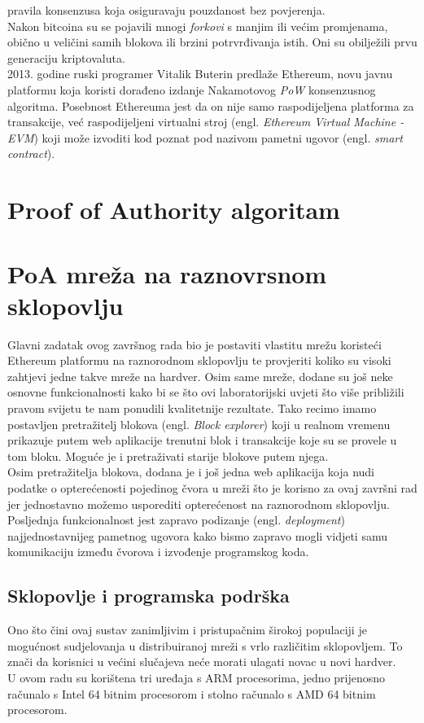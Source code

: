 \documentclass[times, utf8, zavrsni]{fer}
\begin{document}
pravila konsenzusa koja osiguravaju pouzdanost bez povjerenja. \\
Nakon bitcoina su se pojavili mnogi \emph{forkovi} s manjim ili većim promjenama, obično u veličini
samih blokova ili brzini potrvrđivanja istih. Oni su obilježili prvu generaciju kriptovaluta. \\
2013. godine ruski programer Vitalik Buterin predlaže Ethereum, novu javnu platformu koja koristi 
dorađeno izdanje Nakamotovog \emph{PoW} konsenzusnog algoritma. Posebnost Ethereuma jest da on nije
samo raspodijeljena platforma za transakcije, već raspodijeljeni virtualni stroj (engl. \emph{Ethereum Virtual Machine -EVM})
 koji može izvoditi kod poznat pod nazivom pametni ugovor (engl. \emph{smart contract}). \\



\chapter{Proof of Authority algoritam}

\chapter{PoA mreža na raznovrsnom sklopovlju}
Glavni zadatak ovog završnog rada bio je postaviti vlastitu mrežu koristeći Ethereum platformu na raznorodnom sklopovlju
te provjeriti koliko su visoki zahtjevi jedne takve mreže na hardver. Osim same mreže, dodane su još neke osnovne funkcionalnosti
kako bi se što ovi laboratorijski uvjeti što više približili pravom svijetu te nam ponudili kvalitetnije rezultate. Tako recimo
imamo postavljen pretražitelj blokova (engl. \emph{Block explorer}) koji u realnom vremenu prikazuje putem web aplikacije
trenutni blok i transakcije koje su se provele u tom bloku. Moguće je i pretraživati starije blokove putem njega. \\
Osim pretražitelja blokova, dodana je i još jedna web aplikacija koja nudi podatke o opterećenosti pojedinog čvora u mreži
što je korisno za ovaj završni rad jer jednostavno možemo usporediti opterećenost na raznorodnom sklopovlju. \\
Posljednja funkcionalnost jest zapravo podizanje (engl. \emph{deployment}) najjednostavnijeg pametnog ugovora kako bismo
zapravo mogli vidjeti samu komunikaciju između čvorova i izvođenje programskog koda.

\section{Sklopovlje i programska podrška}
Ono što čini ovaj sustav zanimljivim i pristupačnim širokoj populaciji je mogućnost sudjelovanja u distribuiranoj mreži s vrlo
različitim sklopovljem. To znači da korisnici u većini slučajeva neće morati ulagati novac u novi hardver.\\ U ovom radu su korištena
tri uređaja s ARM procesorima, jedno prijenosno računalo s Intel 64 bitnim procesorom i stolno računalo s AMD 64 bitnim procesorom.
\end{document}

